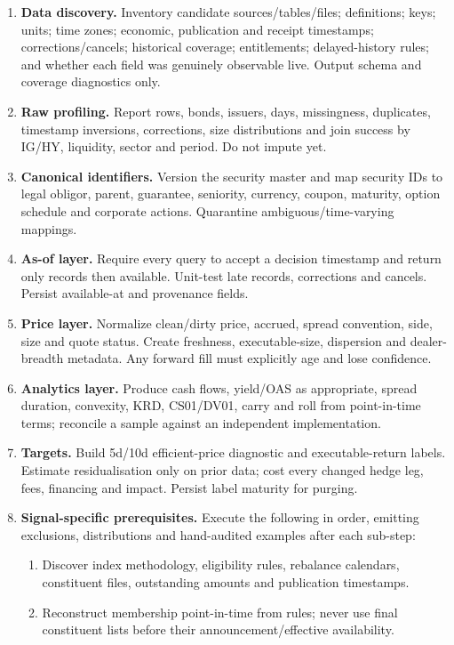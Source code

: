 \documentclass[10pt]{article}
\begin{document}
\begin{enumerate}[leftmargin=2em,label=\textbf{A\arabic*.}]
\item \textbf{Data discovery.} Inventory candidate sources/tables/files; definitions; keys; units; time zones; economic, publication and receipt timestamps; corrections/cancels; historical coverage; entitlements; delayed-history rules; and whether each field was genuinely observable live. Output schema and coverage diagnostics only.
\item \textbf{Raw profiling.} Report rows, bonds, issuers, days, missingness, duplicates, timestamp inversions, corrections, size distributions and join success by IG/HY, liquidity, sector and period. Do not impute yet.
\item \textbf{Canonical identifiers.} Version the security master and map security IDs to legal obligor, parent, guarantee, seniority, currency, coupon, maturity, option schedule and corporate actions. Quarantine ambiguous/time-varying mappings.
\item \textbf{As-of layer.} Require every query to accept a decision timestamp and return only records then available. Unit-test late records, corrections and cancels. Persist available-at and provenance fields.
\item \textbf{Price layer.} Normalize clean/dirty price, accrued, spread convention, side, size and quote status. Create freshness, executable-size, dispersion and dealer-breadth metadata. Any forward fill must explicitly age and lose confidence.
\item \textbf{Analytics layer.} Produce cash flows, yield/OAS as appropriate, spread duration, convexity, KRD, CS01/DV01, carry and roll from point-in-time terms; reconcile a sample against an independent implementation.
\item \textbf{Targets.} Build 5d/10d efficient-price diagnostic and executable-return labels. Estimate residualisation only on prior data; cost every changed hedge leg, fees, financing and impact. Persist label maturity for purging.
\item \textbf{Signal-specific prerequisites.} Execute the following in order, emitting exclusions, distributions and hand-audited examples after each sub-step:
\begin{enumerate}[label=\alph*)]
\item Discover index methodology, eligibility rules, rebalance calendars, constituent files, outstanding amounts and publication timestamps.
\item Reconstruct membership point-in-time from rules; never use final constituent lists before their announcement/effective availability.

\end{enumerate}
\end{enumerate}
\end{document}
